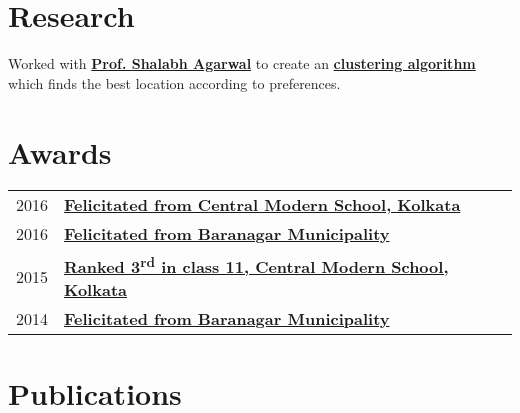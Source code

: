 \documentclass[]{deedy-resume-openfont}
\begin{document}
\begin{minipage}[t]{0.66\textwidth}
\section{Research}
Worked with \textbf{\href{https://www.sxccal.edu/SXC-Faculty/fullProfile/ShalabhAgarwal.pdf}{Prof. Shalabh Agarwal}} to create an \textbf{\href{https://jimut123.github.io/blogs/jjc_wisp.html}{clustering algorithm}} which finds the best location according to preferences.
\sectionsep



\section{Awards} 

\begin{tabular}{rll}
2016	      & \textbf{\href{https://drive.google.com/file/d/0B51qRUWxSiZRSFZDM3lob2ZoVTQ/view}{Felicitated from Central Modern School, Kolkata}} \\
2016     & \textbf{\href{https://drive.google.com/file/d/0B51qRUWxSiZROWZUYTFWZUQxNVE/view}{Felicitated from Baranagar Municipality}} \\
2015     & \textbf{\href{https://drive.google.com/file/d/0B51qRUWxSiZRdmNmQmRyRE5HVUU/view}{Ranked 3\textsuperscript{rd} in class 11, Central Modern School, Kolkata}} \\
2014     & \textbf{\href{https://drive.google.com/file/d/0B51qRUWxSiZRdTl4TUpxMkpJZkE/view}{Felicitated from Baranagar Municipality}} \\
\end{tabular}
\sectionsep


\section{Publications} 
\renewcommand\refname{\vskip -1.5em} %


\nocite{*}

\end{minipage} 
\end{document}
